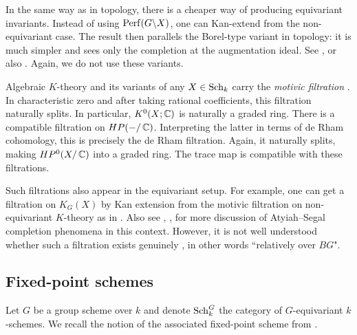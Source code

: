 \begin{remark}
In the same way as in topology, there is a cheaper way of producing equivariant invariants. Instead of using $\operatorname{Perf}(G \backslash X)$, one can Kan-extend from the non-equivariant case. The result then parallels the Borel-type variant in topology: it is much simpler and sees only the completion at the augmentation ideal. See \cite{Tho86}, or also \cite{TV24}. Again, we do not use these variants.    
\end{remark}


\begin{remark}\label{remark: motivic filtrations}
Algebraic $K$-theory and its variants of any $X \in \operatorname{Sch}_{k}$ carry the \textit{motivic filtration} \cite{EM23}. In characteristic zero and after taking rational coefficients, this filtration naturally splits. In particular, $K^0(X; \operatorname{\mathbb{C}})$ is naturally a graded ring. There is a compatible filtration on $HP(-/ \operatorname{\mathbb{C}})$. Interpreting the latter in terms of de Rham cohomology, this is precisely the de Rham filtration. Again, it naturally splits, making $HP^0(X/ \operatorname{\mathbb{C}})$ into a graded ring. The trace map is compatible with these filtrations.

Such filtrations also appear in the equivariant setup. For example, one can get a filtration on $K_G(X)$ by Kan extension from the motivic filtration on non-equivariant $K$-theory as in \cite{EKS25}. Also see \cite[(2.6)]{TV24}, \cite{KN25}, \cite{EKS25} for more discussion of Atyiah--Segal completion phenomena in this context. However, it is not well understood whether such a filtration exists genuinely \cite[Question 1.0.2]{EKS25}, in other words ``relatively over $BG$".
\end{remark}










\subsection{Fixed-point schemes}\label{section: fixed-point schemes}


Let $G$ be a group scheme over $k$ and denote $\operatorname{Sch}_k^G$ the category of $G$-equivariant $k$-schemes. We recall the notion of the associated fixed-point scheme from \cite[\S 1]{Low24}.



